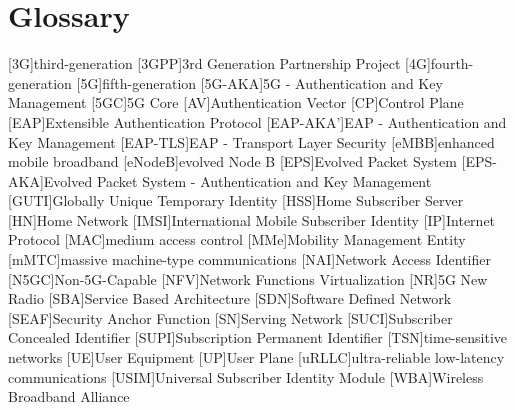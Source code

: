 \chapter{Glossary}

\footnotesize
\SingleSpacing

\begin{acronym}[AAAAAA]
[3G]{third-generation}
[3GPP]{3rd Generation Partnership Project}
[4G]{fourth-generation}
[5G]{fifth-generation}
[5G-AKA]{5G - Authentication and Key Management}
[5GC]{5G Core}
[AV]{Authentication Vector}
[CP]{Control Plane}
[EAP]{Extensible Authentication Protocol}
[EAP-AKA']{EAP - Authentication and Key Management}
[EAP-TLS]{EAP - Transport Layer Security}
[eMBB]{enhanced mobile broadband}
[eNodeB]{evolved Node B}
[EPS]{Evolved Packet System}
[EPS-AKA]{Evolved Packet System - Authentication and Key Management}
[GUTI]{Globally Unique Temporary Identity}
[HSS]{Home Subscriber Server}
[HN]{Home Network}
[IMSI]{International Mobile Subscriber Identity}
[IP]{Internet Protocol}
[MAC]{medium access control}
[MMe]{Mobility Management Entity}
[mMTC]{massive machine-type communications}
[NAI]{Network Access Identifier}
[N5GC]{Non-5G-Capable}
[NFV]{Network Functions Virtualization}
[NR]{5G New Radio}
[SBA]{Service Based Architecture}
[SDN]{Software Defined Network}
[SEAF]{Security Anchor Function}
[SN]{Serving Network}
[SUCI]{Subscriber Concealed Identifier}
[SUPI]{Subscription Permanent Identifier}
[TSN]{time-sensitive networks}
[UE]{User Equipment}
[UP]{User Plane}
[uRLLC]{ultra-reliable low-latency communications}
[USIM]{Universal Subscriber Identity Module}
[WBA]{Wireless Broadband Alliance}
\end{acronym}